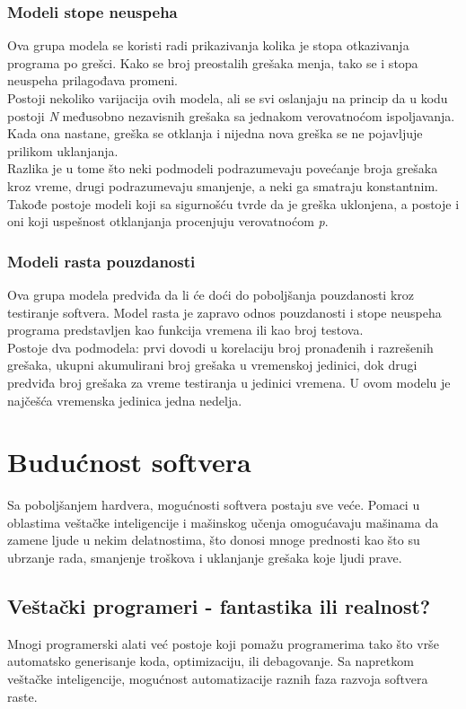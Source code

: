 \documentclass[a4paper]{article}
\begin{document}
\subsubsection{Modeli stope neuspeha}
\label{subsec:stopa_neuspeha}

Ova grupa modela se koristi radi prikazivanja kolika je stopa otkazivanja programa po grešci. Kako se broj preostalih grešaka menja, tako se i stopa neuspeha prilagođava promeni.\\
Postoji nekoliko varijacija ovih modela, ali se svi oslanjaju na princip da u kodu postoji \textit{N} međusobno nezavisnih grešaka sa jednakom verovatnoćom ispoljavanja. Kada ona nastane, greška se otklanja i nijedna nova greška se ne pojavljuje prilikom uklanjanja.\\
Razlika je u tome što neki podmodeli podrazumevaju povećanje broja grešaka kroz vreme, drugi podrazumevaju smanjenje, a neki ga smatraju konstantnim. Takođe postoje modeli koji sa sigurnošću tvrde da je greška uklonjena, a postoje i oni koji uspešnost otklanjanja procenjuju verovatnoćom \textit{p}.

\subsubsection{Modeli rasta pouzdanosti}
\label{subsec:rast_pouzdanosti}

Ova grupa modela predviđa da li će doći do poboljšanja pouzdanosti kroz testiranje softvera. Model rasta je zapravo odnos pouzdanosti i stope neuspeha programa predstavljen kao funkcija vremena ili kao broj testova.\\
Postoje dva podmodela: prvi dovodi u korelaciju broj pronađenih i razrešenih grešaka, ukupni akumulirani broj grešaka u vremenskoj jedinici, dok drugi predviđa broj grešaka za vreme testiranja u jedinici vremena. U ovom modelu je najčešća vremenska jedinica jedna nedelja.


\section{Budućnost softvera}
\label{sec:buducnost}

Sa poboljšanjem hardvera, mogućnosti softvera postaju sve veće. Pomaci u oblastima veštačke inteligencije i mašinskog učenja omogućavaju mašinama da zamene ljude u nekim delatnostima, što donosi mnoge prednosti kao što su ubrzanje rada, smanjenje troškova i uklanjanje grešaka koje ljudi prave.

\subsection{Veštački programeri - fantastika ili realnost?}
Mnogi programerski alati već postoje koji pomažu programerima tako što vrše automatsko generisanje koda, optimizaciju, ili debagovanje.
Sa napretkom veštačke inteligencije, mogućnost automatizacije raznih faza razvoja softvera raste.
\end{document}
